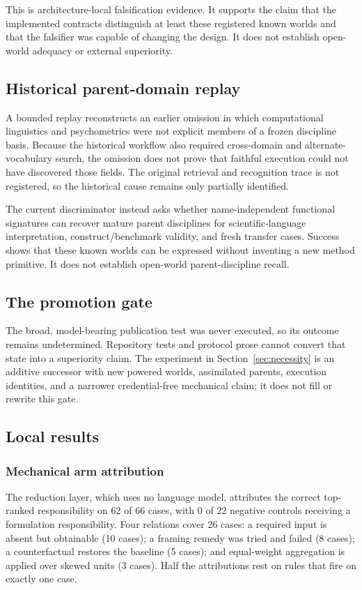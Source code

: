 This is architecture-local falsification evidence. It supports the claim that
the implemented contracts distinguish at least these registered known worlds and
that the falsifier was capable of changing the design. It does not establish
open-world adequacy or external superiority.

\subsection{Historical parent-domain replay}

A bounded replay reconstructs an earlier omission in which computational
linguistics and psychometrics were not explicit members of a frozen discipline
basis. Because the historical workflow also required cross-domain and
alternate-vocabulary search, the omission does not prove that faithful execution
could not have discovered those fields. The original retrieval and recognition
trace is not registered, so the historical cause remains only partially
identified.

The current discriminator instead asks whether name-independent functional
signatures can recover mature parent disciplines for scientific-language
interpretation, construct/benchmark validity, and fresh transfer cases. Success
shows that these known worlds can be expressed without inventing a new method
primitive. It does not establish open-world parent-discipline recall.

\subsection{The promotion gate}

The broad, model-bearing publication test was never executed, so its outcome
remains undetermined. Repository tests and protocol prose cannot convert that
state into a superiority claim. The experiment in
Section~\ref{sec:necessity} is an additive successor with new powered worlds,
assimilated parents, execution identities, and a narrower credential-free
mechanical claim; it does not fill or rewrite this gate.

\subsection{Local results}

\subsubsection{Mechanical arm attribution}
The reduction layer, which uses no language model, attributes the correct
top-ranked responsibility on 62 of 66 cases, with 0 of 22 negative controls
receiving a formulation responsibility. Four relations cover 26 cases: a
required input is absent but obtainable (10 cases); a framing remedy was tried
and failed (8 cases); a counterfactual restores the baseline (5 cases); and
equal-weight aggregation is applied over skewed units (3 cases). Half the
attributions rest on rules that fire on exactly one case.

